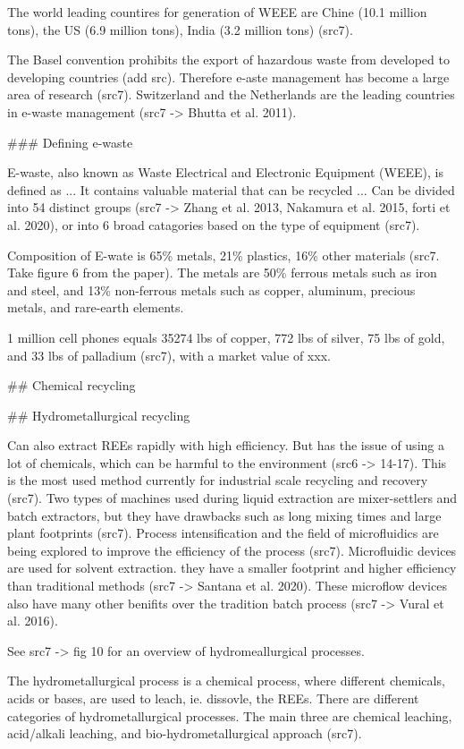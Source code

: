 The world leading countires for generation of WEEE are Chine (10.1 million tons), the US (6.9 million tons), India (3.2 million tons) (src7).

The Basel convention prohibits the export of hazardous waste from developed to developing countries (add src). Therefore e-aste management has become a large area of research (src7). Switzerland and the Netherlands are the leading countries in e-waste management (src7 -> Bhutta et al. 2011).

### Defining e-waste

E-waste, also known as Waste Electrical and Electronic Equipment (WEEE), is defined as ... 
It contains valuable material that can be recycled ...
Can be divided into 54 distinct groups (src7 -> Zhang et al. 2013, Nakamura et al. 2015, forti et al. 2020), or into 6 broad catagories based on the type of equipment (src7).

Composition of E-wate is 65\% metals, 21\% plastics, 16\% other materials (src7. Take figure 6 from the paper). The metals are 50\% ferrous metals such as iron and steel, and 13\% non-ferrous metals such as copper, aluminum, precious metals, and rare-earth elements. 

1 million cell phones equals 35274 lbs of copper, 772 lbs of silver, 75 lbs of gold, and 33 lbs of palladium (src7), with a market value of xxx.


## Chemical recycling

## Hydrometallurgical recycling

Can also extract REEs rapidly with high efficiency. But has the issue of using a lot of chemicals, which can be harmful to the environment (src6 -> 14-17). This is the most used method currently for industrial scale recycling and recovery (src7). Two types of machines used during liquid extraction are mixer-settlers and batch extractors, but they have drawbacks such as long mixing times and large plant footprints (src7). Process intensification and the field of microfluidics are being explored to improve the efficiency of the process (src7). Microfluidic devices are used for solvent extraction. they have a smaller footprint and higher efficiency than traditional methods (src7 -> Santana et al. 2020). These microflow devices also have many other benifits over the tradition batch process (src7 -> Vural et al. 2016).

See src7 -> fig 10 for an overview of hydromeallurgical processes.

The hydrometallurgical process is a chemical process, where different chemicals, acids or bases, are used to leach, ie. dissovle, the REEs. There are different categories of hydrometallurgical processes. The main three are chemical leaching, acid/alkali leaching, and bio-hydrometallurgical approach (src7). 

